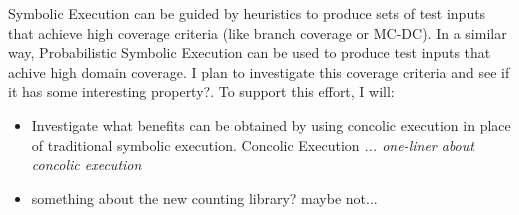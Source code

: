 \documentclass[12pt]{article}
\newcounter{list}
\begin{document}
Symbolic Execution can be guided by heuristics to produce sets of test
inputs that achieve high coverage criteria (like branch coverage or
MC-DC). In a similar way, Probabilistic Symbolic Execution can be used
to produce test inputs that achive high domain coverage. I plan to
investigate this coverage criteria and see if it {has some interesting
  property?}. To support this effort, I will:
\begin{itemize}
\item Investigate what benefits can be obtained by using concolic
  execution in place of traditional symbolic execution. Concolic
  Execution \textit{... one-liner about concolic execution}
\item {something about the new counting library? maybe not...}
  
\end{itemize}





 
\end{document}
